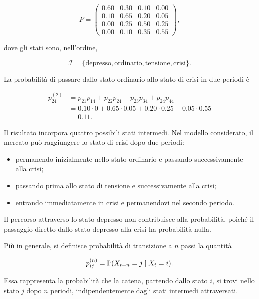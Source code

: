 \[
P=
\begin{pmatrix}
0.60 & 0.30 & 0.10 & 0.00\\
0.10 & 0.65 & 0.20 & 0.05\\
0.00 & 0.25 & 0.50 & 0.25\\
0.00 & 0.10 & 0.35 & 0.55
\end{pmatrix},
\]

dove gli stati sono, nell'ordine,

\[
\mathcal{I}
=
\{
\text{depresso},
\text{ordinario},
\text{tensione},
\text{crisi}
\}.
\]

La probabilit\`{a} di passare dallo stato ordinario allo stato di crisi
in due periodi \`{e}

\[
\begin{split}
p_{24}^{(2)}
&=
p_{21}p_{14}
+
p_{22}p_{24}
+
p_{23}p_{34}
+
p_{24}p_{44}
\\
&=
0.10\cdot 0
+
0.65\cdot 0.05
+
0.20\cdot 0.25
+
0.05\cdot 0.55
\\
&=
0.11.
\end{split}
\]

Il risultato incorpora quattro possibili stati intermedi. Nel modello
considerato, il mercato pu\`{o} raggiungere lo stato di crisi dopo due
periodi:

\begin{itemize}

\item permanendo inizialmente nello stato ordinario e passando
successivamente alla crisi;

\item passando prima allo stato di tensione e successivamente alla crisi;

\item entrando immediatamente in crisi e permanendovi nel secondo
periodo.

\end{itemize}

Il percorso attraverso lo stato depresso non contribuisce alla
probabilit\`{a}, poich\'{e} il passaggio diretto dallo stato depresso
alla crisi ha probabilit\`{a} nulla.

Pi\`{u} in generale, si definisce probabilit\`{a} di transizione a
\(n\) passi la quantit\`{a}

\[
p_{ij}^{(n)}
=
\mathbb{P}(X_{t+n}=j\mid X_t=i).
\]

Essa rappresenta la probabilit\`{a} che la catena, partendo dallo stato
\(i\), si trovi nello stato \(j\) dopo \(n\) periodi, indipendentemente
dagli stati intermedi attraversati.


